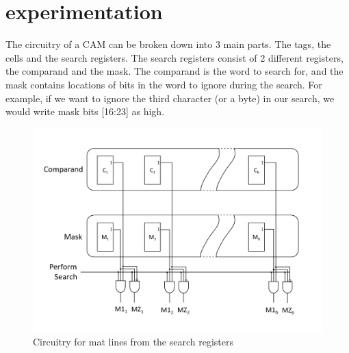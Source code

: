 \section{experimentation}
The circuitry of a CAM can be broken down into 3 main parts. The tags, the cells and the search registers. 
The search registers consist of 2 different registers, the comparand and the mask. 
The comparand is the word to search for, and the mask contains locations of bits in the word to ignore during the search.
For example, if we want to ignore the third character (or a byte) in our search, we would write mask bits [16:23] as high.
\begin{figure}
    \includegraphics[width=1\columnwidth]{search_registers.png}
    \caption[Short text]{Circuitry for mat lines from the search registers}
\end{figure}
\\\\
